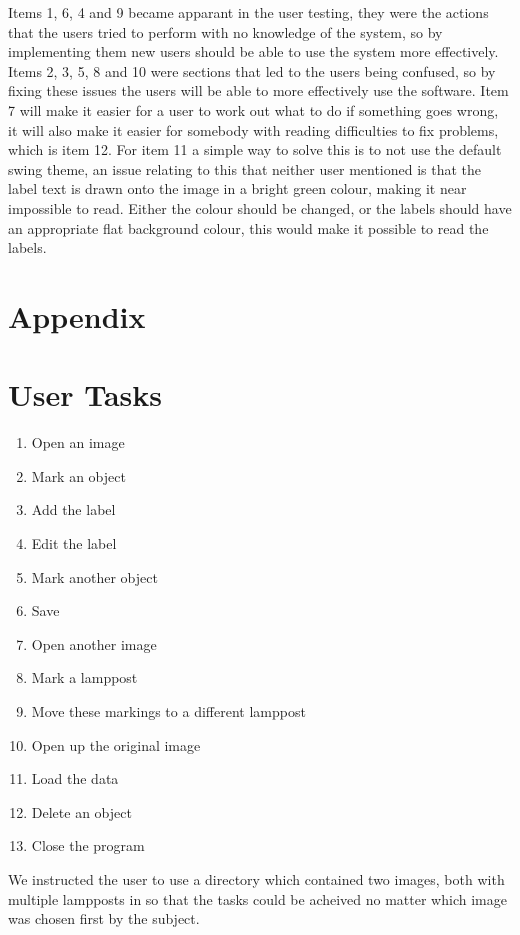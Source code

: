\documentclass[a4paper,11pt,oneside]{article}
\begin{document}
Items 1, 6, 4 and 9 became apparant in the user testing, they were the actions that the users tried to perform with no knowledge of the system, so by implementing them new users should be able to use the system more effectively.  Items 2, 3, 5, 8 and 10 were sections that led to the users being confused, so by fixing these issues the users will be able to more effectively use the software.  Item 7 will make it easier for a user to work out what to do if something goes wrong, it will also make it easier for somebody with reading difficulties to fix problems, which is item 12.  For item 11 a simple way to solve this is to not use the default swing theme, an issue relating to this that neither user mentioned is that the label text is drawn onto the image in a bright green colour, making it near impossible to read.  Either the colour should be changed, or the labels should have an appropriate flat background colour, this would make it possible to read the labels.

\newpage
\section{Appendix}
\appendix

\section{User Tasks}
\label{sec:tasks}

\begin{enumerate}
    \item Open an image
    \item Mark an object
    \item Add the label
    \item Edit the label
    \item Mark another object
    \item Save
    \item Open another image
    \item Mark a lamppost
    \item Move these markings to a different lamppost
    \item Open up the original image
    \item Load the data
    \item Delete an object
    \item Close the program
\end{enumerate}

We instructed the user to use a directory which contained two images, both with multiple lampposts in so that the tasks could be acheived no matter which image was chosen first by the subject.
\end{document}
